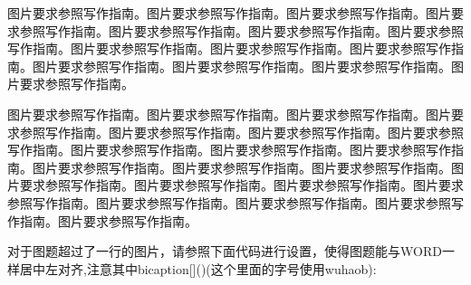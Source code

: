 \vspace{-0.2cm} %

图片要求参照写作指南。图片要求参照写作指南。图片要求参照写作指南。图片要求参照写作指南。图片要求参照写作指南。图片要求参照写作指南。图片要求参照写作指南。图片要求参照写作指南。图片要求参照写作指南。图片要求参照写作指南。图片要求参照写作指南。图片要求参照写作指南。图片要求参照写作指南。图片要求参照写作指南。

图片要求参照写作指南。图片要求参照写作指南。图片要求参照写作指南。图片要求参照写作指南。图片要求参照写作指南。图片要求参照写作指南。图片要求参照写作指南。图片要求参照写作指南。图片要求参照写作指南。图片要求参照写作指南。图片要求参照写作指南。图片要求参照写作指南。图片要求参照写作指南。图片要求参照写作指南。图片要求参照写作指南。图片要求参照写作指南。图片要求参照写作指南。图片要求参照写作指南。图片要求参照写作指南。图片要求参照写作指南。图片要求参照写作指南。


对于图题超过了一行的图片，请参照下面代码进行设置，使得图题能与WORD一样居中左对齐,注意其中bicaption[]()(这个里面的字号使用wuhaob):

\vspace{0.3cm}

